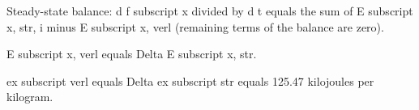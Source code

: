 Steady-state balance:  
d f subscript x divided by d t equals the sum of E subscript x, str, i minus E subscript x, verl (remaining terms of the balance are zero).  

E subscript x, verl equals Delta E subscript x, str.  

ex subscript verl equals Delta ex subscript str equals 125.47 kilojoules per kilogram.